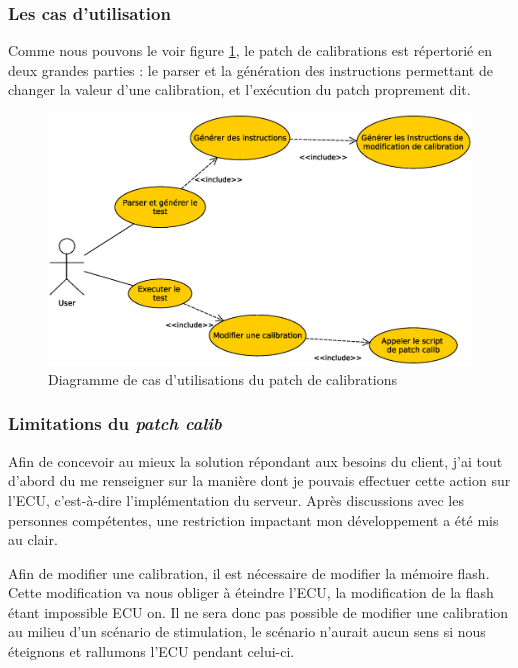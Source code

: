 \subsubsection{Les cas d'utilisation}

		Comme nous pouvons le voir figure \ref{fig:patch-cal-usecase}, le patch de calibrations est répertorié en deux grandes parties : le parser et la génération des instructions permettant de changer la valeur d'une calibration, et l'exécution du patch proprement dit.
		\begin{figure}[H]
			\centering
			\includegraphics[width=18cm]{contents/images/patch-cal_usecase.eps}
			\caption{Diagramme de cas d'utilisations du patch de calibrations}
			\label{fig:patch-cal-usecase}
		\end{figure}

		\subsubsection{Limitations du \textit{patch calib}}
		Afin de concevoir au mieux la solution répondant aux besoins du client, j'ai tout d'abord du me renseigner sur la manière dont je pouvais effectuer cette action sur l'ECU, c'est-à-dire l'implémentation du serveur. Après discussions avec les personnes compétentes, une restriction impactant mon développement a été mis au clair.
		
		Afin de modifier une calibration, il est nécessaire de modifier la mémoire flash. Cette modification va nous obliger à éteindre l'ECU, la modification de la flash étant impossible ECU on. Il ne sera donc pas possible de modifier une calibration au milieu d'un scénario de stimulation, le scénario n'aurait aucun sens si nous éteignons et rallumons l'ECU pendant celui-ci.
		

